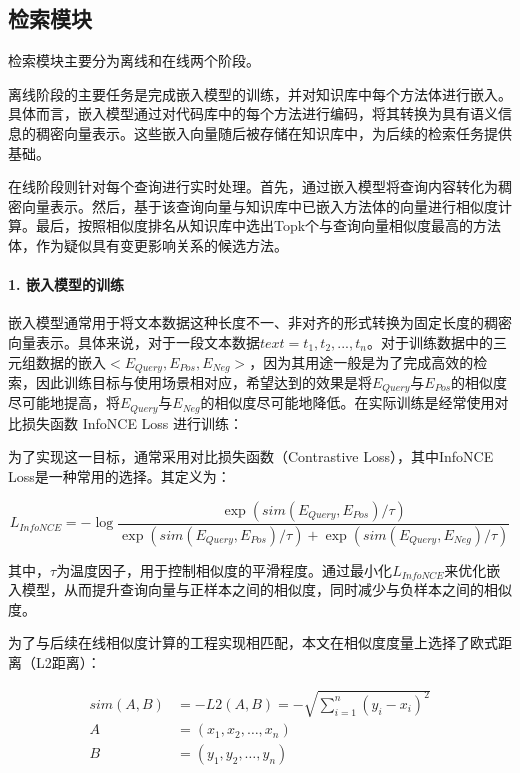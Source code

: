 \subsection{检索模块}

检索模块主要分为离线和在线两个阶段。

离线阶段的主要任务是完成嵌入模型的训练，并对知识库中每个方法体进行嵌入。具体而言，嵌入模型通过对代码库中的每个方法进行编码，将其转换为具有语义信息的稠密向量表示。这些嵌入向量随后被存储在知识库中，为后续的检索任务提供基础。

在线阶段则针对每个查询进行实时处理。首先，通过嵌入模型将查询内容转化为稠密向量表示。然后，基于该查询向量与知识库中已嵌入方法体的向量进行相似度计算。最后，按照相似度排名从知识库中选出Topk个与查询向量相似度最高的方法体，作为疑似具有变更影响关系的候选方法。

\paragraph{1. 嵌入模型的训练}

嵌入模型通常用于将文本数据这种长度不一、非对齐的形式转换为固定长度的稠密向量表示。具体来说，对于一段文本数据$text={t_1, t_2, ..., t_n}$。对于训练数据中的三元组数据的嵌入$<E_{Query},E_{Pos},E_{Neg}>$，因为其用途一般是为了完成高效的检索，因此训练目标与使用场景相对应，希望达到的效果是将$E_{Query}$与$E_{Pos}$的相似度尽可能地提高，将$E_{Query}$与$E_{Neg}$的相似度尽可能地降低。在实际训练是经常使用对比损失函数 InfoNCE Loss 进行训练：

为了实现这一目标，通常采用对比损失函数（Contrastive Loss），其中InfoNCE Loss是一种常用的选择。其定义为：

\begin{equation}
    L_{InfoNCE} = -\log\frac{\exp(sim(E_{Query}, E_{Pos}) / \tau)}{\exp(sim(E_{Query}, E_{Pos}) / \tau)+\exp(sim(E_{Query}, E_{Neg}) / \tau)}
\end{equation}

其中，$\tau$为温度因子，用于控制相似度的平滑程度。通过最小化$L_{InfoNCE}$来优化嵌入模型，从而提升查询向量与正样本之间的相似度，同时减少与负样本之间的相似度。

为了与后续在线相似度计算的工程实现相匹配，本文在相似度度量上选择了欧式距离（L2距离）：

\begin{align}
sim(A,B)&=-L2(A, B)  = -\sqrt{\sum_{i=1}^{n} (y_i - x_i)^2} \\
A &= (x_1, x_2, \dots, x_n) \\
B &= (y_1, y_2, \dots, y_n)
\end{align}

